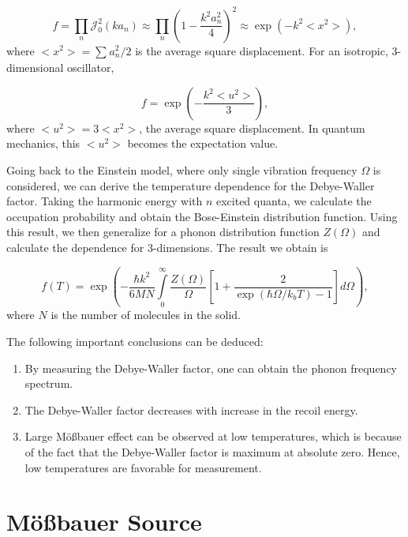 \documentclass[a4paper]{report}
\numberwithin{equation}{section}
\begin{document}
\begin{equation} \label{eqn:product}
		f = \prod_n \mathcal{J}_{0}^2(ka_{n}) \approx \prod_n \left( 1 - \frac{k^2 a_n^2}{4}\right)^2 \approx \exp \left(- k^2 < x^2 > \right),   
\end{equation}
where $< x^2 > = \sum_{}^{} a_{n}^2 / 2$ is the average square displacement. For an isotropic, 3-dimensional oscillator, 

\begin{equation}
		f = \exp \left( - \frac{k^2 < u^2 >}{3} \right),
\end{equation}
where $< u^2 > = 3 < x^2 >$, the average square displacement. In quantum mechanics, this $< u^2 >$ becomes the expectation value.

Going back to the Einstein model, where only single vibration frequency $\Omega $ is considered, we can derive the temperature dependence for the Debye-Waller factor. Taking the harmonic energy with $n$ excited quanta, we calculate the occupation probability and obtain the Bose-Einstein distribution function. Using this result, we then generalize for a phonon distribution function $Z(\Omega )$ and calculate the dependence for 3-dimensions. The result we obtain is

\begin{equation}
		f(T) = \exp \left( - \frac{\hbar k^2}{6 M N } \int\limits_{0}^{\infty} \frac{Z(\Omega )}{\Omega } \left[ 1 + \frac{2}{\exp(\hbar \Omega / k_{b} T) - 1 } \right] d \Omega \right),
\end{equation}
where $N$ is the number of molecules in the solid. 

The following important conclusions can be deduced: 
\begin{enumerate}
		\item By measuring the Debye-Waller factor, one can obtain the phonon frequency spectrum.
		\item The Debye-Waller factor decreases with increase in the recoil energy.
		\item Large M\"o{\ss}bauer effect can be observed at low temperatures, which is because of the fact that the Debye-Waller factor is maximum at absolute zero. Hence, low temperatures are favorable for measurement.
\end{enumerate}

\section{M\"o{\ss}bauer Source}
\end{document}
